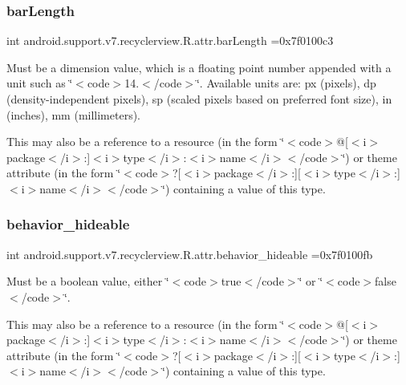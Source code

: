 \subsubsection{\texorpdfstring{bar\+Length}{barLength}}
{\footnotesize\ttfamily int android.\+support.\+v7.\+recyclerview.\+R.\+attr.\+bar\+Length =0x7f0100c3\hspace{0.3cm}{\ttfamily [static]}}

Must be a dimension value, which is a floating point number appended with a unit such as \char`\"{}$<$code$>$14.\+5sp$<$/code$>$\char`\"{}. Available units are\+: px (pixels), dp (density-\/independent pixels), sp (scaled pixels based on preferred font size), in (inches), mm (millimeters). 

This may also be a reference to a resource (in the form \char`\"{}$<$code$>$@\mbox{[}$<$i$>$package$<$/i$>$\+:\mbox{]}$<$i$>$type$<$/i$>$\+:$<$i$>$name$<$/i$>$$<$/code$>$\char`\"{}) or theme attribute (in the form \char`\"{}$<$code$>$?\mbox{[}$<$i$>$package$<$/i$>$\+:\mbox{]}\mbox{[}$<$i$>$type$<$/i$>$\+:\mbox{]}$<$i$>$name$<$/i$>$$<$/code$>$\char`\"{}) containing a value of this type. \mbox{\label{classandroid_1_1support_1_1v7_1_1recyclerview_1_1R_1_1attr_a4d9a2ea1242fbd7dd6b1263292c7c357}} 
\subsubsection{\texorpdfstring{behavior\+\_\+hideable}{behavior\_hideable}}
{\footnotesize\ttfamily int android.\+support.\+v7.\+recyclerview.\+R.\+attr.\+behavior\+\_\+hideable =0x7f0100fb\hspace{0.3cm}{\ttfamily [static]}}

Must be a boolean value, either \char`\"{}$<$code$>$true$<$/code$>$\char`\"{} or \char`\"{}$<$code$>$false$<$/code$>$\char`\"{}. 

This may also be a reference to a resource (in the form \char`\"{}$<$code$>$@\mbox{[}$<$i$>$package$<$/i$>$\+:\mbox{]}$<$i$>$type$<$/i$>$\+:$<$i$>$name$<$/i$>$$<$/code$>$\char`\"{}) or theme attribute (in the form \char`\"{}$<$code$>$?\mbox{[}$<$i$>$package$<$/i$>$\+:\mbox{]}\mbox{[}$<$i$>$type$<$/i$>$\+:\mbox{]}$<$i$>$name$<$/i$>$$<$/code$>$\char`\"{}) containing a value of this type. \mbox{\label{classandroid_1_1support_1_1v7_1_1recyclerview_1_1R_1_1attr_a7db5a320717a718475aa12716a032298}} 

